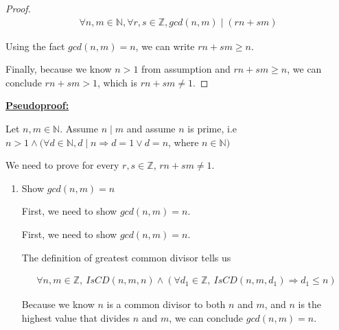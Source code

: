 \documentclass[12pt]{article}
\begin{document}
\begin{enumerate}[a.]
\begin{proof}
        \begin{align}
            \forall n,m \in \mathbb{N}, \forall r,s \in \mathbb{Z}, gcd(n,m) \mid (rn + sm)
        \end{align}

        \bigskip

        Using the fact $gcd(n,m) = n$, we can write $rn + sm \geq n$.

        \bigskip

        Finally, because we know $n > 1$ from assumption and $rn + sm \geq n$, we can conclude $rn + sm > 1$,
        which is $rn + sm \neq 1$.
    \end{proof}

    \bigskip

    \begin{mdframed}
        \underline{\textbf{Pseudoproof:}}

        \bigskip

        Let $n,m \in \mathbb{N}$. Assume $n \mid m$ and assume $n$ is prime, i.e
        $n > 1 \land (\forall d \in \mathbb{N}, d \mid n \Rightarrow d = 1 \lor d = n$, where $n \in \mathbb{N})$

        \bigskip

        We need to prove for every $r,s \in \mathbb{Z}$, $rn + sm \neq 1$.

        \bigskip

        \begin{enumerate}[1.]
            \item Show $gcd(n,m) = n$

            \bigskip

            First, we need to show $gcd(n,m) = n$.

            \begin{mdframed}
                First, we need to show $gcd(n,m) = n$.

                \bigskip

                The definition of greatest common divisor tells us

                \begin{align}
                    \forall n,m \in \mathbb{Z},\:IsCD(n,m,n) \land (\forall d_1 \in \mathbb{Z},\: IsCD(n,m,d_1) \Rightarrow d_1 \leq n)
                \end{align}

                \bigskip

                Because we know $n$ is a common divisor to both $n$ and $m$, and $n$
                is the highest value that divides $n$ and $m$, we can conclude
                $gcd(n,m) = n$.


\end{mdframed}
\end{enumerate}
\end{mdframed}
\end{enumerate}
\end{document}
